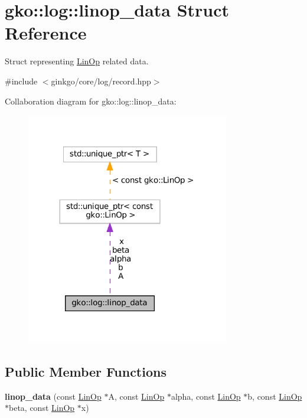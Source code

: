 \hypertarget{structgko_1_1log_1_1linop__data}{}\section{gko\+:\+:log\+:\+:linop\+\_\+data Struct Reference}
\label{structgko_1_1log_1_1linop__data}


Struct representing \hyperlink{classgko_1_1LinOp}{Lin\+Op} related data.  




{\ttfamily \#include $<$ginkgo/core/log/record.\+hpp$>$}



Collaboration diagram for gko\+:\+:log\+:\+:linop\+\_\+data\+:
\nopagebreak
\begin{figure}[H]
\begin{center}
\leavevmode
\includegraphics[width=251pt]{structgko_1_1log_1_1linop__data__coll__graph}
\end{center}
\end{figure}
\subsection*{Public Member Functions}
\begin{DoxyCompactItemize}
\item 
\mbox{\label{structgko_1_1log_1_1linop__data_add7ae70af891b64f25849432f9279d62}} 
{\bfseries linop\+\_\+data} (const \hyperlink{classgko_1_1LinOp}{Lin\+Op} $\ast$A, const \hyperlink{classgko_1_1LinOp}{Lin\+Op} $\ast$alpha, const \hyperlink{classgko_1_1LinOp}{Lin\+Op} $\ast$b, const \hyperlink{classgko_1_1LinOp}{Lin\+Op} $\ast$beta, const \hyperlink{classgko_1_1LinOp}{Lin\+Op} $\ast$x)
\end{DoxyCompactItemize}
